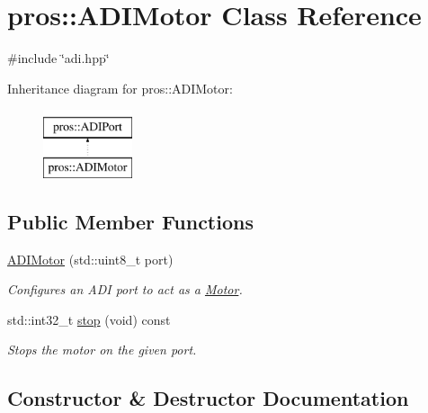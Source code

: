 \hypertarget{classpros_1_1ADIMotor}{}\section{pros\+:\+:A\+D\+I\+Motor Class Reference}
\label{classpros_1_1ADIMotor}


{\ttfamily \#include \char`\"{}adi.\+hpp\char`\"{}}

Inheritance diagram for pros\+:\+:A\+D\+I\+Motor\+:\begin{figure}[H]
\begin{center}
\leavevmode
\includegraphics[height=2.000000cm]{classpros_1_1ADIMotor}
\end{center}
\end{figure}
\subsection*{Public Member Functions}
\begin{DoxyCompactItemize}
\item 
\hyperlink{classpros_1_1ADIMotor_afd2da0e8c53a8bc0c999d5232242069a}{A\+D\+I\+Motor} (std\+::uint8\+\_\+t port)
\begin{DoxyCompactList}\small\item\em Configures an A\+DI port to act as a \hyperlink{classpros_1_1Motor}{Motor}. \end{DoxyCompactList}\item 
std\+::int32\+\_\+t \hyperlink{classpros_1_1ADIMotor_ad8e9be8dfbc022e893a4d15996fe3bcd}{stop} (void) const
\begin{DoxyCompactList}\small\item\em Stops the motor on the given port. \end{DoxyCompactList}\end{DoxyCompactItemize}


\subsection{Constructor \& Destructor Documentation}
\mbox{\label{classpros_1_1ADIMotor_afd2da0e8c53a8bc0c999d5232242069a}} 
